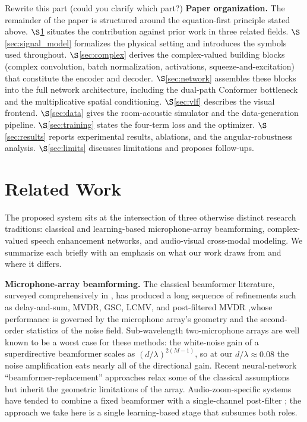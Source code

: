 \documentclass[journal,10pt]{IEEEtran}
\begin{document}
{\color{red} Rewrite this part (could you clarify which part?)}
\textbf{Paper organization.}{\color{blue} The remainder of the paper is structured around the equation-first principle stated above. \(\S\)\ref{sec:related} situates the contribution against prior work in three related fields. \(\S\)\ref{sec:signal_model} formalizes the physical setting and introduces the symbols used throughout. \(\S\)\ref{sec:complex} derives the complex-valued building blocks (complex convolution, batch normalization, activations, squeeze-and-excitation) that constitute the encoder and decoder. \(\S\)\ref{sec:network} assembles these blocks into the full network architecture, including the dual-path Conformer bottleneck and the multiplicative spatial conditioning. \(\S\)\ref{sec:vlf} describes the visual frontend. \(\S\)\ref{sec:data} gives the room-acoustic simulator and the data-generation pipeline. \(\S\)\ref{sec:training} states the four-term loss and the optimizer. \(\S\)\ref{sec:results} reports experimental results, ablations, and the angular-robustness analysis. \(\S\)\ref{sec:limits} discusses limitations and proposes follow-ups.}

\section{Related Work}
\label{sec:related}
The proposed system sits at the intersection of three otherwise distinct research traditions: classical and learning-based microphone-array beamforming, complex-valued speech enhancement networks, and audio-visual cross-modal modeling. We summarize each briefly with an emphasis on what our work draws from and where it differs.

\textbf{Microphone-array beamforming.} The classical beamformer literature, surveyed comprehensively in \cite{elbir2023twenty}, has produced a long sequence of refinements such as delay-and-sum, MVDR, GSC, LCMV, and post-filtered MVDR ,whose performance is governed by the microphone array's geometry and the second-order statistics of the noise field. Sub-wavelength two-microphone arrays are well known to be a worst case for these methods: the white-noise gain of a superdirective beamformer scales as \((d/\lambda)^{2(M-1)}\), so at our \(d/\lambda\approx 0.08\) the noise amplification eats nearly all of the directional gain. Recent neural-network ``beamformer-replacement'' approaches \cite{heymann2017generic,yamaoka2021time} relax some of the classical assumptions but inherit the geometric limitations of the array. Audio-zoom-specific systems have tended to combine a fixed beamformer with a single-channel post-filter \cite{khandelwal2021two,duong2017audio}; the approach we take here is a single learning-based stage that subsumes both roles.
\end{document}
